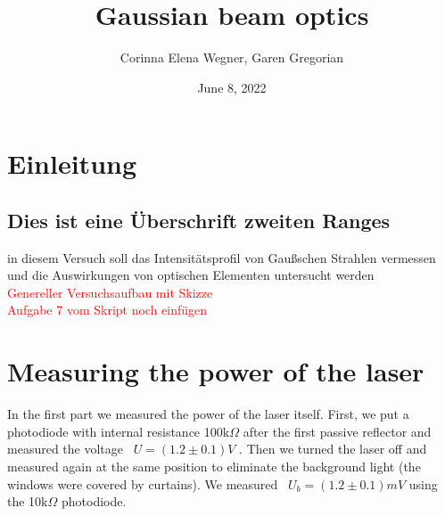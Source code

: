\documentclass{article}
\begin{document}
 

\begin{titlepage}
\title{Gaussian beam optics}
\author{Corinna Elena Wegner, Garen Gregorian}
\date{June 8, 2022}
\maketitle %
\end{titlepage}

\newpage
\tableofcontents
\newpage

\section{Einleitung} %
\subsection{Dies ist eine Überschrift zweiten Ranges}

in diesem Versuch soll das Intensitätsprofil von Gaußschen Strahlen vermessen und die Auswirkungen von optischen Elementen untersucht werden\\

\textcolor{red}{Genereller Versuchsaufbau mit Skizze}\\

\textcolor{red}{Aufgabe 7 vom Skript noch einfügen}

\section{Measuring the power of the laser}

In the first part we measured the power of the laser itself. First, we put a photodiode with internal resistance 100k$\Omega$
after the first passive reflector and measured the voltage
\ $U=(1.2 \pm 0.1) V$ %
. Then we turned the laser off and measured again at the same position to eliminate the background light (the windows were covered by curtains). We measured 
\ $U_b = (1.2 \pm 0.1)mV$ 
using the 
10k$\Omega$
photodiode. 
\end{document}
